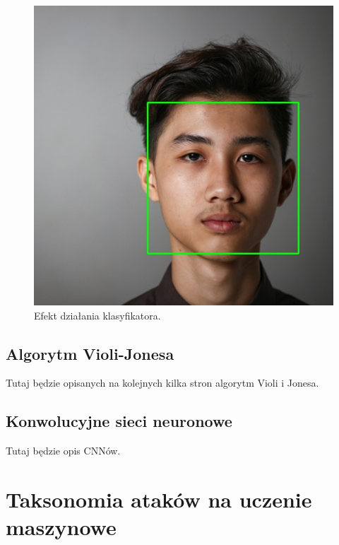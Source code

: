 \documentclass[12pt,a4paper,leqno,oneside,titlepage]{book}
\begin{document}
\begin{figure}[!tbp]
\begin{minipage}[b]{0.4\textwidth}
    \includegraphics[width=\textwidth]{pictures/face_detected.jpg}
    \caption{Efekt działania klasyfikatora.}
  \end{minipage}
\end{figure}

%
%
%
%
%
%
%
%
%
%
%

\section{Algorytm Violi-Jonesa}

Tutaj będzie opisanych na kolejnych kilka stron algorytm Violi i Jonesa. 

%
%
%
%
%
%
%
%
%
%
%

\section{Konwolucyjne sieci neuronowe}

Tutaj będzie opis CNNów.

%
%
%
%
%
%
%
%
%
%

\chapter{Taksonomia ataków na uczenie maszynowe}
\end{document}
